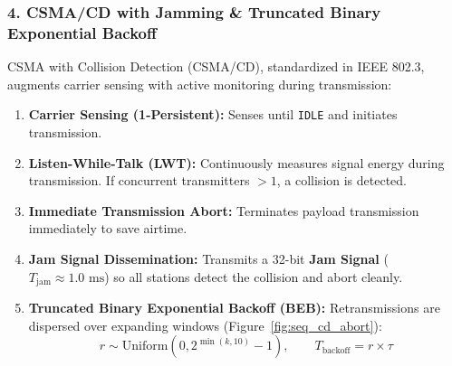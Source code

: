 \documentclass[11pt,a4paper]{article}
\begin{document}
\subsubsection{4. CSMA/CD with Jamming \& Truncated Binary Exponential Backoff}
CSMA with Collision Detection (CSMA/CD), standardized in IEEE 802.3, augments carrier sensing with active monitoring during transmission:
\begin{enumerate}
    \item \textbf{Carrier Sensing (1-Persistent):} Senses until \texttt{IDLE} and initiates transmission.
    \item \textbf{Listen-While-Talk (LWT):} Continuously measures signal energy during transmission. If concurrent transmitters $> 1$, a collision is detected.
    \item \textbf{Immediate Transmission Abort:} Terminates payload transmission immediately to save airtime.
    \item \textbf{Jam Signal Dissemination:} Transmits a 32-bit \textbf{Jam Signal} ($T_{\text{jam}} \approx 1.0\text{ ms}$) so all stations detect the collision and abort cleanly.
    \item \textbf{Truncated Binary Exponential Backoff (BEB):} Retransmissions are dispersed over expanding windows (Figure~\ref{fig:seq_cd_abort}):
    \begin{equation}
        r \sim \text{Uniform}(0, 2^{\min(k, 10)} - 1), \qquad T_{\text{backoff}} = r \times \tau
    \end{equation}
\end{enumerate}
\end{document}
